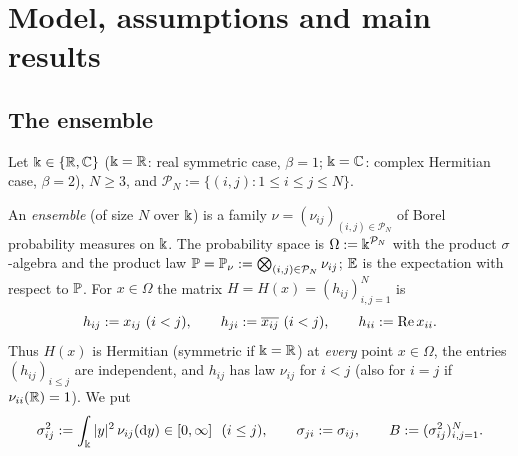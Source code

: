 \section{Model, assumptions and main results}\label{sec:main}

\subsection{The ensemble}
Let $\Bbbk\in\{\mathbb{R},\mathbb{C}\}$ ($\Bbbk=\mathbb{R}$: real symmetric case, $\beta=1$; $\Bbbk=\mathbb{C}$: complex Hermitian case, $\beta=2$), $N\ge3$, and
$\mathcal P_N:=\{(i,j): 1\le i\le j\le N\}$.

\begin{definition}[Ensemble]\label{def:ens}
An \emph{ensemble} (of size $N$ over $\Bbbk$) is a family $\nu=(\nu_{ij})_{(i,j)\in\mathcal P_N}$ of Borel probability measures on $\Bbbk$.
The probability space is $\Omega:=\Bbbk^{\mathcal P_N}$ with the product $\sigma$-algebra and the product law $\mathbb{P}=\mathbb{P}_\nu:=\bigotimes_{(i,j)\in\mathcal P_N}\nu_{ij}$; $\mathbb{E}$ is the expectation with respect to $\mathbb{P}$.
For $x\in\Omega$ the matrix $H=H(x)=(h_{ij})_{i,j=1}^N$ is
\[
 h_{ij}:=x_{ij}\ (i<j),\qquad h_{ji}:=\overline{x_{ij}}\ (i<j),\qquad h_{ii}:=\operatorname{Re} x_{ii}.
\]
Thus $H(x)$ is Hermitian (symmetric if $\Bbbk=\mathbb{R}$) at \emph{every} point $x\in\Omega$, the entries $(h_{ij})_{i\le j}$ are independent, and
$h_{ij}$ has law $\nu_{ij}$ for $i<j$ (also for $i=j$ if $\nu_{ii}(\mathbb{R})=1$).
We put
\begin{equation}\label{eq:aver}
 \sigma_{ij}^2:=\int_{\Bbbk}|y|^2\,\nu_{ij}(\mathrm{d} y)\in[0,\infty]\ \ (i\le j),\qquad \sigma_{ji}:=\sigma_{ij},\qquad B:=(\sigma_{ij}^2)_{i,j=1}^N .
\end{equation}
\end{definition}

